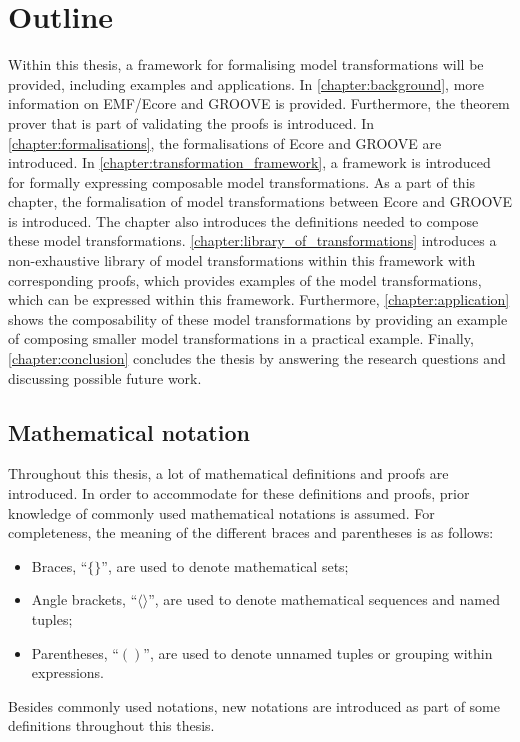 \section{Outline}
\label{sec:introduction:outline}
Within this thesis, a framework for formalising model transformations will be provided, including examples and applications. In \cref{chapter:background}, more information on EMF/Ecore and GROOVE is provided. Furthermore, the theorem prover that is part of validating the proofs is introduced. In \cref{chapter:formalisations}, the formalisations of Ecore and GROOVE are introduced.
In \cref{chapter:transformation_framework}, a framework is introduced for formally expressing composable model transformations. As a part of this chapter, the formalisation of model transformations between Ecore and GROOVE is introduced. The chapter also introduces the definitions needed to compose these model transformations. \cref{chapter:library_of_transformations} introduces a non-exhaustive library of model transformations within this framework with corresponding proofs, which provides examples of the model transformations, which can be expressed within this framework. Furthermore, \cref{chapter:application} shows the composability of these model transformations by providing an example of composing smaller model transformations in a practical example. Finally, \cref{chapter:conclusion} concludes the thesis by answering the research questions and discussing possible future work.

\subsection{Mathematical notation}
\label{subsec:introduction:outline:mathematical_notation}
Throughout this thesis, a lot of mathematical definitions and proofs are introduced. In order to accommodate for these definitions and proofs, prior knowledge of commonly used mathematical notations is assumed. For completeness, the meaning of the different braces and parentheses is as follows:
\begin{itemize}
    \item Braces, ``$\{\}$'', are used to denote mathematical sets;
    \item Angle brackets, ``$\langle \rangle$'', are used to denote mathematical sequences and named tuples;
    \item Parentheses, ``$()$'', are used to denote unnamed tuples or grouping within expressions.
\end{itemize}
Besides commonly used notations, new notations are introduced as part of some definitions throughout this thesis.

